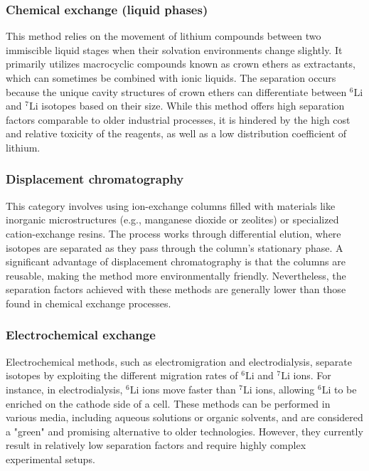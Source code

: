     \subsubsection{Chemical exchange (liquid phases)} 
    \label{subsubsec_chemical_exchange}
    This method relies on the movement of lithium compounds between two immiscible liquid stages when their solvation environments change slightly. It primarily utilizes macrocyclic compounds known as crown ethers as extractants, which can sometimes be combined with ionic liquids. The separation occurs because the unique cavity structures of crown ethers can differentiate between $^{6}\text{Li}$ and $^{7}\text{Li}$ isotopes based on their size. While this method offers high separation factors comparable to older industrial processes, it is hindered by the high cost and relative toxicity of the reagents, as well as a low distribution coefficient of lithium. \cite{BadeaLiIsotopes2023}


    \subsubsection{Displacement chromatography} 
    \label{subsubsec_displacement_chromatography}
    This category involves using ion-exchange columns filled with materials like inorganic microstructures (e.g., manganese dioxide or zeolites) or specialized cation-exchange resins. The process works through differential elution, where isotopes are separated as they pass through the column's stationary phase. A significant advantage of displacement chromatography is that the columns are reusable, making the method more environmentally friendly. Nevertheless, the separation factors achieved with these methods are generally lower than those found in chemical exchange processes. \cite{BadeaLiIsotopes2023}


    \subsubsection{Electrochemical exchange} 
    \label{subsubsec_electrochemical_exchange}
    Electrochemical methods, such as electromigration and electrodialysis, separate isotopes by exploiting the different migration rates of $^{6}\text{Li}$ and $^{7}\text{Li}$ ions. For instance, in electrodialysis, $^{6}\text{Li}$ ions move faster than $^{7}\text{Li}$ ions, allowing $^{6}\text{Li}$ to be enriched on the cathode side of a cell. These methods can be performed in various media, including aqueous solutions or organic solvents, and are considered a "green" and promising alternative to older technologies. However, they currently result in relatively low separation factors and require highly complex experimental setups. \cite{BadeaLiIsotopes2023}

